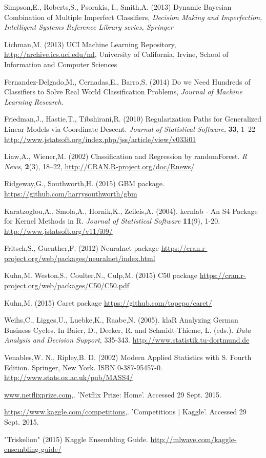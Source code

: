 \documentclass{bioinfo}
\begin{document}
\begin{thebibliography}{9}

Simpson,E., Roberts,S., Psorakis, I., Smith,A. (2013) Dynamic Bayesian Combination of Multiple Imperfect Classifiers, {\it Decision Making and Imperfection, Intelligent Systems Reference Library series, Springer}

Lichman,M. (2013) UCI Machine Learning Repository, \url{http://archive.ics.uci.edu/ml}, University of California, Irvine, School of Information and Computer Sciences

Fernandez-Delgado,M., Cernadas,E., Barro,S. (2014) Do we Need Hundreds of Classifiers to Solve Real World Classification Problems, {\it Journal of Machine Learning Research}.

Friedman,J., Hastie,T., Tibshirani,R. (2010) Regularization Paths for Generalized Linear Models via Coordinate Descent. \textit{Journal of Statistical Software}, \textbf{33}, 1--22 \url{http://www.jstatsoft.org/index.php/jss/article/view/v033i01}

Liaw,A., Wiener,M. (2002) Classification and Regression by randomForest. \textit{R News}, \textbf{2}(3), 18--22, \url{http://CRAN.R-project.org/doc/Rnews/}

Ridgeway,G., Southworth,H. (2015) GBM package. \url{https://github.com/harrysouthworth/gbm}

Karatzoglou,A., Smola,A., Hornik,K., Zeileis,A. (2004). kernlab - An S4 Package for Kernel Methods in R. \textit{Journal of Statistical Software} \textbf{11}(9), 1-20. \url{http://www.jstatsoft.org/v11/i09/}

Fritsch,S., Guenther,F. (2012) Neuralnet package \url{https://cran.r-project.org/web/packages/neuralnet/index.html}

Kuhn,M. Weston,S., Coulter,N., Culp,M. (2015) C50 package \url{https://cran.r-project.org/web/packages/C50/C50.pdf}

Kuhn,M. (2015) Caret package \url{https://github.com/topepo/caret/}

Weihs,C., Ligges,U., Luebke,K., Raabe,N. (2005). klaR Analyzing German Business Cycles. In Baier, D., Decker, R. and Schmidt-Thieme, L. (eds.). \textit{Data Analysis and Decision Support}, 335-343. \url{http://www.statistik.tu-dortmund.de}

Venables,W. N., Ripley,B. D. (2002) Modern Applied Statistics with S. Fourth Edition. Springer, New York. ISBN 0-387-95457-0. \url{http://www.stats.ox.ac.uk/pub/MASS4/}

\url{www.netflixprize.com},. 'Netflix Prize: Home'. Accessed 29 Sept. 2015.

\url{https://www.kaggle.com/competitions},. 'Competitions | Kaggle'. Accessed 29 Sept. 2015.

"Triskelion" (2015) Kaggle Ensembling Guide. \url{http://mlwave.com/kaggle-ensembling-guide/}


\end{thebibliography}
\end{document}
